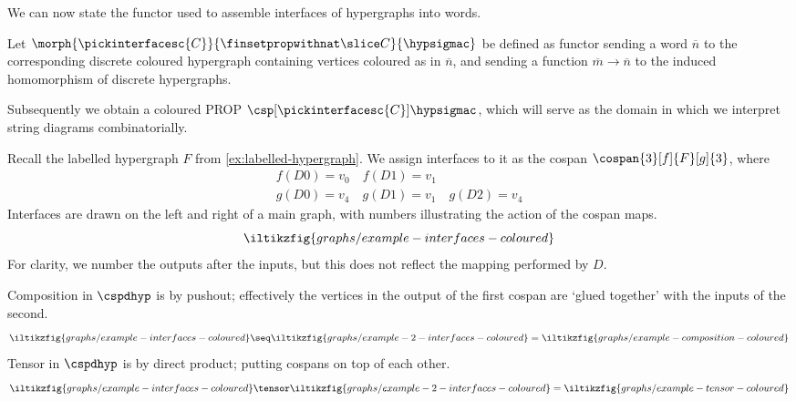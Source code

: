 We can now state the functor used to assemble interfaces of hypergraphs into
words.

\begin{definition}
    Let \(\morph{\pickinterfacesc{C}}{\finsetpropwithnat \slice C}{\hypsigmac}\)
    be defined as functor sending a word \(\overline{n}\) to the corresponding
    discrete coloured hypergraph containing vertices coloured as in
    \(\overline{n}\), and sending a function \(\overline{m} \to \overline{n}\)
    to the induced homomorphism of discrete hypergraphs.
\end{definition}

Subsequently we obtain a coloured PROP \(
    \csp[\pickinterfacesc{C}]{\hypsigmac}
\), which will serve as the domain in which we interpret string diagrams
combinatorially.

\begin{example}
    Recall the labelled hypergraph \(F\) from \cref{ex:labelled-hypergraph}.
    We assign interfaces to it as the cospan \(\cospan{3}[f]{F}[g]{3}\), where
    \begin{gather*}
        f(D0) = v_0 \quad f(D1) = v_1 \\
        g(D0) = v_4 \quad g(D1) = v_1 \quad g(D2) = v_4
    \end{gather*}
    Interfaces are drawn on the left and right of a main graph, with numbers
    illustrating the action of the cospan maps.
    \[
        \iltikzfig{graphs/example-interfaces-coloured}
    \]
    For clarity, we number the outputs after the inputs, but this does not
    reflect the mapping performed by \(D\).

    Composition in \(\cspdhyp\) is by pushout; effectively the vertices in the
    output of the first cospan are `glued together' with the inputs of the
    second.
    \[
        \iltikzfig{graphs/example-interfaces-coloured}
        \seq
        \iltikzfig{graphs/example-2-interfaces-coloured}
        =
        \iltikzfig{graphs/example-composition-coloured}
    \]
    Tensor in \(\cspdhyp\) is by direct product; putting cospans on top of each
    other.
    \[
        \iltikzfig{graphs/example-interfaces-coloured}
        \tensor
        \iltikzfig{graphs/example-2-interfaces-coloured}
        =
        \iltikzfig{graphs/example-tensor-coloured}
    \]
\end{example}